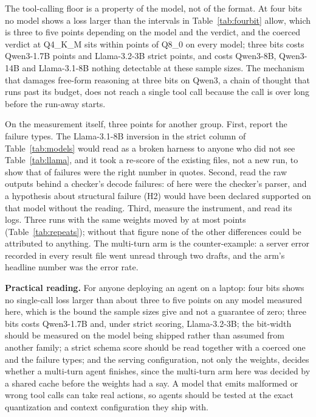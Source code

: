 \documentclass[12pt,letterpaper]{article}
\newcommand{\qm}{Qwen3-1.7B}
\begin{document}
The tool-calling floor is a property of the model, not of the format. At four bits no model shows a loss larger than the intervals in Table~\ref{tab:fourbit} allow, which is three to five points depending on the model and the verdict, and the coerced verdict at Q4\_K\_M sits within \qtCoercedDropLlamaThreeBFour{} points of Q8\_0 on every model; three bits costs \qm{} \qtDropThree{} points and Llama-3.2-3B \qtDropLlamaThreeBThree{} strict points, and costs Qwen3-8B, Qwen3-14B and Llama-3.1-8B nothing detectable at these sample sizes. The mechanism that damages free-form reasoning at three bits on Qwen3, a chain of thought that runs past its budget, does not reach a single tool call because the call is over long before the run-away starts.

On the measurement itself, three points for another group. First, report the failure types. The Llama-3.1-8B inversion in the strict column of Table~\ref{tab:models} would read as a broken harness to anyone who did not see Table~\ref{tab:llama}, and it took a re-score of the existing files, not a new run, to show that \qtCoercibleLlamaEightBEight{} of \qtFailsLlamaEightBEight{} failures were the right number in quotes. Second, read the raw outputs behind a checker's decode failures: \qtDecodeJsonLlamaEightBThree{} of \qtDecodeErrLlamaEightBThree{} here were the checker's parser, and a hypothesis about structural failure (H2) would have been declared supported on that model without the reading. Third, measure the instrument, and read its logs. Three runs with the same weights moved by at most \qtMaxRepRange{} points (Table~\ref{tab:repeats}); without that figure none of the other differences could be attributed to anything. The multi-turn arm is the counter-example: a server error recorded in every result file went unread through two drafts, and the arm's headline number was the error rate.

\textbf{Practical reading.} For anyone deploying an agent on a laptop: four bits shows no single-call loss larger than about three to five points on any model measured here, which is the bound the sample sizes give and not a guarantee of zero; three bits costs \qm{} and, under strict scoring, Llama-3.2-3B; the bit-width should be measured on the model being shipped rather than assumed from another family; a strict schema score should be read together with a coerced one and the failure types; and the serving configuration, not only the weights, decides whether a multi-turn agent finishes, since the multi-turn arm here was decided by a shared cache before the weights had a say. A model that emits malformed or wrong tool calls can take real actions, so agents should be tested at the exact quantization and context configuration they ship with.
\end{document}
